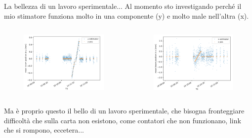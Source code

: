 \documentclass[
10pt,
aspectratio=169,
]{beamer}
\begin{document}
\begin{frame}{La bellezza di un lavoro sperimentale...}
Al momento sto investigando perché il mio stimatore funziona molto in una componente (y) e molto male nell'altra (x).
\vspace{-0.2cm}
    \begin{columns}
        \begin{figure}
            \centering
            \includegraphics[width=\textwidth]{y_estimator.png}
        \end{figure}
        \begin{figure}
            \centering
            \includegraphics[width=\textwidth]{x_estimator.png}
        \end{figure}
    \end{columns}
    \vfill
    Ma è proprio questo il bello di un lavoro sperimentale, che bisogna fronteggiare difficoltà che sulla carta non esistono, come contatori che non funzionano, link che si rompono, eccetera...
\end{frame}
\end{document}
